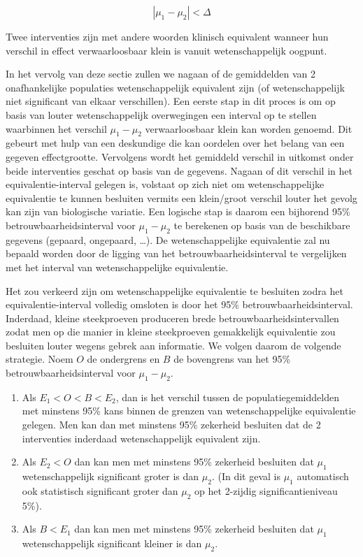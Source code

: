 \documentclass[
  12pt,dutch,coursenotes]{book}
\begin{document}
\begin{equation*}
|\mu_1 - \mu_2| < \Delta
\end{equation*}

Twee interventies zijn met andere woorden klinisch equivalent
wanneer hun verschil in effect verwaarloosbaar klein is vanuit wetenschappelijk
oogpunt.

In het vervolg van deze sectie zullen we nagaan of de gemiddelden van 2 onafhankelijke
populaties wetenschappelijk equivalent zijn (of wetenschappelijk niet significant van elkaar
verschillen). Een eerste stap in dit proces is om op basis van louter
wetenschappelijk overwegingen een interval op te stellen waarbinnen het verschil \(\mu_1-\mu_2\) verwaarloosbaar klein kan worden genoemd. Dit gebeurt met hulp van een deskundige die kan oordelen over het belang van een gegeven
effectgrootte. Vervolgens wordt het gemiddeld verschil in uitkomst onder
beide interventies geschat op basis van de gegevens. Nagaan of dit verschil
in het equivalentie-interval gelegen is, volstaat op zich niet om wetenschappelijke
equivalentie te kunnen besluiten vermits een klein/groot verschil louter
het gevolg kan zijn van biologische variatie. Een logische stap is daarom
een bijhorend 95\% betrouwbaarheidsinterval voor \(\mu_1 - \mu_2\) te berekenen op basis van de beschikbare gegevens (gepaard, ongepaard, \ldots). De wetenschappelijke equivalentie zal nu bepaald worden door de ligging van het
betrouwbaarheidsinterval te vergelijken met het interval van wetenschappelijke
equivalentie.

Het zou verkeerd zijn om wetenschappelijke equivalentie te besluiten zodra het
equivalentie-interval volledig omsloten is door het 95\%
betrouwbaarheidsinterval. Inderdaad, kleine steekproeven produceren brede
betrouwbaarheidsintervallen zodat men op die manier in kleine steekproeven
gemakkelijk equivalentie zou besluiten louter wegens gebrek aan
informatie. We volgen daarom de volgende strategie. Noem \(O\) de ondergrens
en \(B\) de bovengrens van het 95\% betrouwbaarheidsinterval voor \(\mu_1-\mu_2\).

\begin{enumerate}
\def\labelenumi{\arabic{enumi}.}
\item
  Als \(E_1 < O < B < E_2\), dan is het verschil tussen de populatiegemiddelden met minstens 95\% kans binnen de grenzen van wetenschappelijke equivalentie gelegen. Men kan dan met minstens 95\% zekerheid besluiten dat de 2 interventies inderdaad wetenschappelijk equivalent zijn.
\item
  Als \(E_2 < O\) dan kan men met minstens 95\% zekerheid besluiten dat \(\mu_1\) wetenschappelijk significant groter is dan \(\mu_2\). (In dit geval is \(\mu_1\) automatisch ook statistisch significant groter dan \(\mu_2\) op het 2-zijdig significantieniveau 5\%).
\item
  Als \(B < E_1\) dan kan men met minstens 95\% zekerheid besluiten dat \(\mu_1\) wetenschappelijk significant kleiner is dan \(\mu_2.\)
\end{enumerate}
\end{document}
